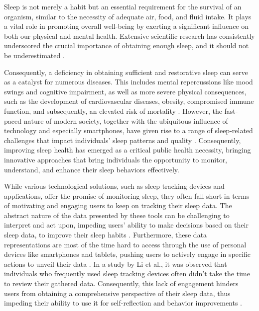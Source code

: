 \documentclass[
  a4paper,  %
  twoside,  %
  bibliography=totoc,
  headsepline,
  cleardoublepage=empty,
  parskip=half,
  draft=false
]{scrbook}
\begin{document}
Sleep is not merely a habit but an essential requirement for the survival of an organism, similar to the necessity of adequate air, food, and fluid intake. It plays a vital role in promoting overall well-being by exerting a significant influence on both our physical and mental health. Extensive scientific research has consistently underscored the crucial importance of obtaining enough sleep, and it should not be underestimated \cite{Define_Sleep_Health}.

Consequently, a deficiency in obtaining sufficient and restorative sleep can serve as a catalyst for numerous diseases. This includes mental repercussions like mood swings and cognitive impairment, as well as more severe physical consequences, such as the development of cardiovascular diseases, obesity, compromised immune function, and subsequently, an elevated risk of mortality \cite{Mortality_short_sleep, consequences_sleep_deprivation}. However, the fast-paced nature of modern society, together with the ubiquitous influence of technology and especially smartphones, have given rise to a range of sleep-related challenges that impact individuals’ sleep patterns and quality \cite{problematic_smartphone_use}. Consequently, improving sleep health has emerged as a critical public health necessity, bringing innovative approaches that bring individuals the opportunity to monitor, understand, and enhance their sleep behaviors effectively.

While various technological solutions, such as sleep tracking devices and applications, offer the promise of monitoring sleep, they often fall short in terms of motivating and engaging users to keep on tracking their sleep data. The abstract nature of the data presented by these tools can be challenging to interpret and act upon, impeding users' ability to make decisions based on their sleep data, to improve their sleep habits \cite{Sleep_essential_to_health}.
Furthermore, these data representations are most of the time hard to access through the use of personal devices like smartphones and tablets, pushing users to actively engage in specific actions to unveil their data \cite{Ambient_visualization}. In a study by Li et al., it was observed that individuals who frequently used sleep tracking devices often didn't take the time to review their gathered data. Consequently, this lack of engagement hinders users from obtaining a comprehensive perspective of their sleep data, thus impeding their ability to use it for self-reflection and behavior improvements \cite{Stage_Based_Model}.
\end{document}
